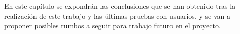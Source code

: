 En este capítulo se expondrán las conclusiones que se han obtenido tras
la realización de este trabajo y las últimas pruebas con usuarios, y se van a proponer posibles rumbos a seguir 
para trabajo futuro en el proyecto.